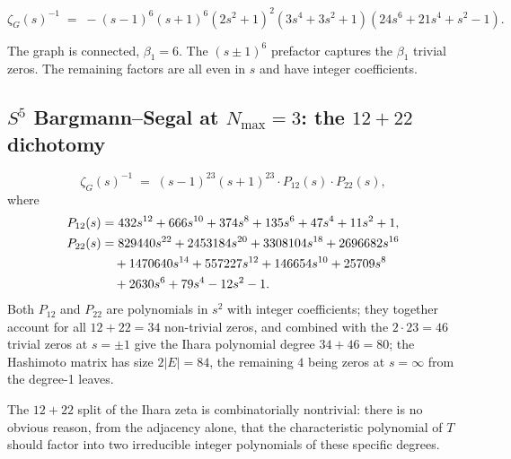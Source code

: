 \documentclass[11pt]{article}
\begin{document}
\begin{equation}
\zeta_G(s)^{-1} \;=\; -(s-1)^6 (s+1)^6 (2s^2 + 1)^2 (3s^4 + 3s^2 + 1)
    (24s^6 + 21s^4 + s^2 - 1).
\label{eq:s5_nmax2_closed}
\end{equation}

The graph is connected, $\beta_1=6$.  The $(s\pm 1)^6$ prefactor
captures the $\beta_1$ trivial zeros.  The remaining factors are all
even in $s$ and have integer coefficients.

\subsection{$S^5$ Bargmann--Segal at $N_{\max}=3$: the $12+22$
dichotomy}

\begin{equation}
\zeta_G(s)^{-1} \;=\; (s-1)^{23}(s+1)^{23}\cdot P_{12}(s) \cdot P_{22}(s),
\label{eq:s5_nmax3_closed}
\end{equation}
where
\begin{align}
P_{12}(s) &= 432 s^{12} + 666 s^{10} + 374 s^8 + 135 s^6 + 47 s^4 + 11 s^2 + 1, \\
P_{22}(s) &= 829440 s^{22} + 2453184 s^{20} + 3308104 s^{18} + 2696682 s^{16} \notag \\
           &\quad + 1470640 s^{14} + 557227 s^{12} + 146654 s^{10} + 25709 s^8 \notag \\
           &\quad + 2630 s^6 + 79 s^4 - 12 s^2 - 1.
\end{align}
Both $P_{12}$ and $P_{22}$ are polynomials in $s^2$ with integer
coefficients; they together account for all $12+22=34$ non-trivial
zeros, and combined with the $2\cdot 23 = 46$ trivial zeros at $s=\pm 1$
give the Ihara polynomial degree $34+46=80$; the Hashimoto matrix has
size $2|E|=84$, the remaining $4$ being zeros at $s=\infty$ from the
degree-1 leaves.

The $12+22$ split of the Ihara zeta is combinatorially nontrivial:
there is no obvious reason, from the adjacency alone, that the
characteristic polynomial of $T$ should factor into two irreducible
integer polynomials of these specific degrees.
\end{document}
